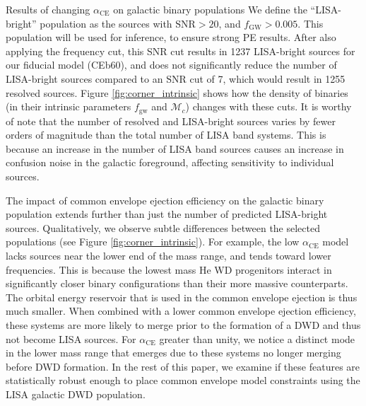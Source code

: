 \documentclass[twocolumn]{aastex631}
\newcommand*\mc{\mathcal{M}_c}
\newcommand*{\fgw}{f_{\mathrm{gw}}}
\newcommand*{\alphaCE}{\alpha_{\mathrm{CE}}}
\begin{document}
\begin{subsection}{Results of changing $\alphaCE{}$ on galactic binary populations}
We define the ``LISA-bright'' population as the sources with $\mathrm{SNR} > 20$,
    and $f_{\mathrm{GW}} > 0.005$.
This population will be used for inference,
    to ensure strong PE results.
After also applying the frequency cut,
    this SNR cut results in 1237 LISA-bright sources
    for our fiducial model (CEb60),
    and does not significantly reduce the number of LISA-bright sources
    compared to an $\mathrm{SNR}$ cut of 7,
    which would result in 1255 resolved sources.
Figure \ref{fig:corner_intrinsic} shows how the density of binaries
    (in their intrinsic parameters $\fgw$ and $\mc$)
    changes with these cuts.
It is worthy of note that the number of resolved and LISA-bright 
    sources varies by fewer orders
    of magnitude than the total number of LISA band systems.
This is because an increase in the number of
    LISA band sources causes an increase in confusion noise
    in the galactic foreground, affecting sensitivity to individual sources.

The impact of common envelope ejection efficiency on the galactic binary population
    extends further than just the number of predicted LISA-bright sources.
Qualitatively, we observe subtle differences between the selected populations
    (see Figure \ref{fig:corner_intrinsic}).
For example, the low $\alphaCE{} $ model lacks sources near the lower end of the mass range,
    and tends toward lower frequencies.
This is because the lowest mass He WD progenitors interact in significantly 
    closer binary configurations than their more massive counterparts. 
The orbital energy reservoir that is used in the common envelope ejection is thus much smaller. 
When combined with a lower common envelope ejection efficiency, these systems are more likely 
    to merge prior to the formation of a DWD and thus not become LISA sources. 
For $\alphaCE{} $ greater than unity, we notice a distinct mode in the lower mass range 
    that emerges due to these systems no longer merging before DWD formation.
In the rest of this paper, we examine if these features are statistically robust
    enough to place common envelope model constraints using the
    LISA galactic DWD population.

\end{subsection}
\end{document}
